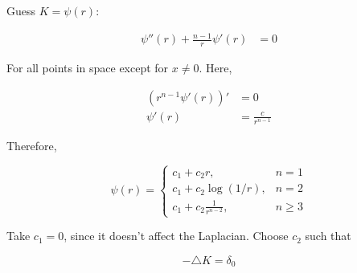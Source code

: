 \documentclass{article}
\newtheorem{one minute paper}[theorem]{One Minute Paper}
\begin{document}
Guess $K = \psi(r)$:

\begin{align}
    \psi''(r) + \frac{n-1}{r}\psi'(r) &= 0
\end{align}

For all points in space except for $x \neq 0$. Here, 

\begin{align*}
    (r^{n-1}\psi'(r))' &= 0 \\
    \psi'(r) &= \frac{c}{r^{n-1}}
\end{align*}

Therefore, 

\begin{equation}
    \psi(r) = \begin{cases}
    c_1 + c_2 r, & n=1 \\
    c_1 + c_2\log(1/r), & n=2 \\
    c_1 + c_2\frac{1}{r^{n-2}}, & n \geq 3
    \end{cases}
\end{equation}

Take $c_1 = 0$, since it doesn't affect the Laplacian. Choose $c_2$ such that 

\begin{equation}
    -\triangle K = \delta_0
\end{equation}
\end{document}
